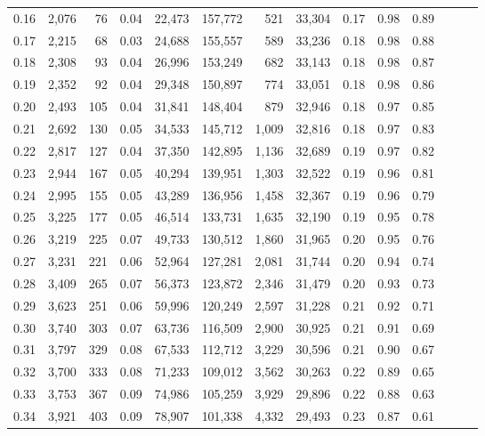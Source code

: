 \begin{tabular}{rrrrrrrrrrrrrr}
0.16 &  2,076 &   76 &  0.04 &   22,473 &  157,772 &     521 &  33,304 &  0.17 &  0.98 &      0.89 \\
0.17 &  2,215 &   68 &  0.03 &   24,688 &  155,557 &     589 &  33,236 &  0.18 &  0.98 &      0.88 \\
0.18 &  2,308 &   93 &  0.04 &   26,996 &  153,249 &     682 &  33,143 &  0.18 &  0.98 &      0.87 \\
0.19 &  2,352 &   92 &  0.04 &   29,348 &  150,897 &     774 &  33,051 &  0.18 &  0.98 &      0.86 \\
0.20 &  2,493 &  105 &  0.04 &   31,841 &  148,404 &     879 &  32,946 &  0.18 &  0.97 &      0.85 \\
0.21 &  2,692 &  130 &  0.05 &   34,533 &  145,712 &   1,009 &  32,816 &  0.18 &  0.97 &      0.83 \\
0.22 &  2,817 &  127 &  0.04 &   37,350 &  142,895 &   1,136 &  32,689 &  0.19 &  0.97 &      0.82 \\
0.23 &  2,944 &  167 &  0.05 &   40,294 &  139,951 &   1,303 &  32,522 &  0.19 &  0.96 &      0.81 \\
0.24 &  2,995 &  155 &  0.05 &   43,289 &  136,956 &   1,458 &  32,367 &  0.19 &  0.96 &      0.79 \\
0.25 &  3,225 &  177 &  0.05 &   46,514 &  133,731 &   1,635 &  32,190 &  0.19 &  0.95 &      0.78 \\
0.26 &  3,219 &  225 &  0.07 &   49,733 &  130,512 &   1,860 &  31,965 &  0.20 &  0.95 &      0.76 \\
0.27 &  3,231 &  221 &  0.06 &   52,964 &  127,281 &   2,081 &  31,744 &  0.20 &  0.94 &      0.74 \\
0.28 &  3,409 &  265 &  0.07 &   56,373 &  123,872 &   2,346 &  31,479 &  0.20 &  0.93 &      0.73 \\
0.29 &  3,623 &  251 &  0.06 &   59,996 &  120,249 &   2,597 &  31,228 &  0.21 &  0.92 &      0.71 \\
0.30 &  3,740 &  303 &  0.07 &   63,736 &  116,509 &   2,900 &  30,925 &  0.21 &  0.91 &      0.69 \\
0.31 &  3,797 &  329 &  0.08 &   67,533 &  112,712 &   3,229 &  30,596 &  0.21 &  0.90 &      0.67 \\
0.32 &  3,700 &  333 &  0.08 &   71,233 &  109,012 &   3,562 &  30,263 &  0.22 &  0.89 &      0.65 \\
0.33 &  3,753 &  367 &  0.09 &   74,986 &  105,259 &   3,929 &  29,896 &  0.22 &  0.88 &      0.63 \\
0.34 &  3,921 &  403 &  0.09 &   78,907 &  101,338 &   4,332 &  29,493 &  0.23 &  0.87 &      0.61 \\

\end{tabular}
